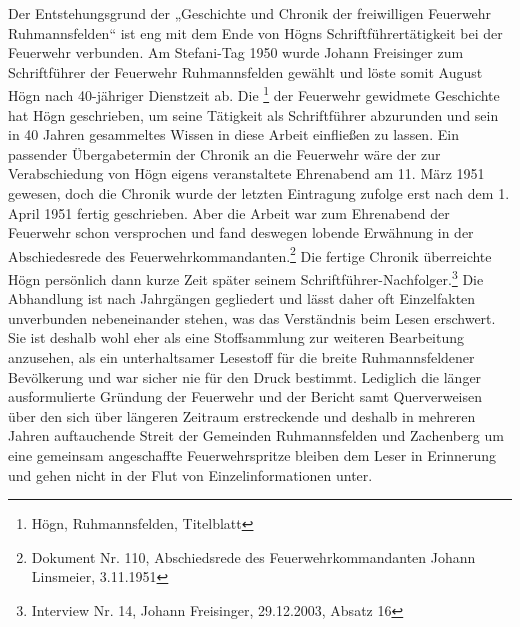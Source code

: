 Der Entstehungsgrund der „Geschichte und Chronik der freiwilligen
Feuerwehr Ruhmannsfelden“ ist eng mit dem Ende von Högns
Schriftführertätigkeit bei der Feuerwehr verbunden. Am Stefani-Tag 1950
wurde Johann Freisinger zum Schriftführer der Feuerwehr Ruhmannsfelden
gewählt und löste somit August Högn nach 40-jähriger Dienstzeit ab. Die
  \footnote{Högn,
Ruhmannsfelden, Titelblatt} der Feuerwehr gewidmete Geschichte hat Högn
geschrieben, um seine Tätigkeit als Schriftführer abzurunden und sein
in 40 Jahren gesammeltes Wissen in diese Arbeit einfließen zu lassen.
Ein passender Übergabetermin der Chronik an die Feuerwehr wäre der zur
Verabschiedung von Högn eigens veranstaltete Ehrenabend am 11. März
1951 gewesen, doch die Chronik wurde der letzten Eintragung zufolge
erst nach dem 1. April 1951 fertig geschrieben. Aber die Arbeit war zum
Ehrenabend der Feuerwehr schon versprochen und fand deswegen lobende
Erwähnung in der Abschiedesrede des Feuerwehrkommandanten.\footnote{
Dokument Nr. 110, Abschiedsrede des Feuerwehrkommandanten Johann
Linsmeier, 3.11.1951} Die fertige Chronik überreichte Högn persönlich
dann kurze Zeit später seinem Schriftführer-Nachfolger.\footnote{
Interview Nr. 14, Johann Freisinger, 29.12.2003, Absatz 16} Die
Abhandlung ist nach Jahrgängen gegliedert und lässt daher oft
Einzelfakten unverbunden nebeneinander stehen, was das Verständnis beim
Lesen erschwert. Sie ist deshalb wohl eher als eine Stoffsammlung zur
weiteren Bearbeitung anzusehen, als ein unterhaltsamer Lesestoff für
die breite Ruhmannsfeldener Bevölkerung und war sicher nie für den
Druck bestimmt. Lediglich die länger ausformulierte Gründung der
Feuerwehr und der Bericht samt Querverweisen über den sich über
längeren Zeitraum erstreckende und deshalb in mehreren Jahren
auftauchende Streit der Gemeinden Ruhmannsfelden und Zachenberg um eine
gemeinsam angeschaffte Feuerwehrspritze bleiben dem Leser in Erinnerung
und gehen nicht in der Flut von Einzelinformationen unter.

